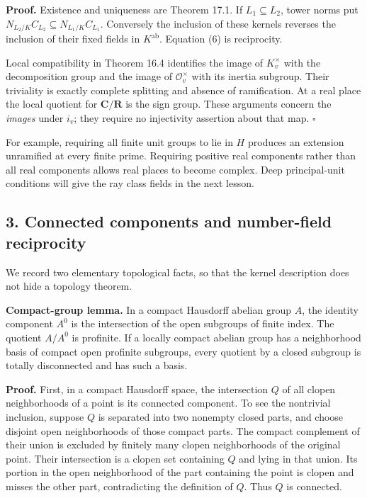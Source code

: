 \documentclass[11pt,a4paper]{article}
\begin{document}
\textbf{Proof.} Existence and uniqueness are Theorem 17.1. If
\(L_1\subseteq L_2\), tower norms put
\(N_{L_2/K}C_{L_2}\subseteq N_{L_1/K}C_{L_1}\). Conversely the inclusion
of these kernels reverses the inclusion of their fixed fields in
\(K^{\mathrm{ab}}\). Equation (6) is reciprocity.

Local compatibility in Theorem 16.4 identifies the image of
\(K_v^\times\) with the decomposition group and the image of
\(\mathcal O_v^\times\) with its inertia subgroup. Their triviality is
exactly complete splitting and absence of ramification. At a real place
the local quotient for \(\mathbf C/\mathbf R\) is the sign group. These
arguments concern the \emph{images} under \(i_v\); they require no
injectivity assertion about that map. \(\square\)

For example, requiring all finite unit groups to lie in \(H\) produces
an extension unramified at every finite prime. Requiring positive real
components rather than all real components allows real places to become
complex. Deep principal-unit conditions will give the ray class fields
in the next lesson.

\subsection{3. Connected components and number-field
reciprocity}\label{connected-components-and-number-field-reciprocity}

We record two elementary topological facts, so that the kernel
description does not hide a topology theorem.

\textbf{Compact-group lemma.} In a compact Hausdorff abelian group
\(A\), the identity component \(A^0\) is the intersection of the open
subgroups of finite index. The quotient \(A/A^0\) is profinite. If a
locally compact abelian group has a neighborhood basis of compact open
profinite subgroups, every quotient by a closed subgroup is totally
disconnected and has such a basis.

\textbf{Proof.} First, in a compact Hausdorff space, the intersection
\(Q\) of all clopen neighborhoods of a point is its connected component.
To see the nontrivial inclusion, suppose \(Q\) is separated into two
nonempty closed parts, and choose disjoint open neighborhoods of those
compact parts. The compact complement of their union is excluded by
finitely many clopen neighborhoods of the original point. Their
intersection is a clopen set containing \(Q\) and lying in that union.
Its portion in the open neighborhood of the part containing the point is
clopen and misses the other part, contradicting the definition of \(Q\).
Thus \(Q\) is connected.
\end{document}
